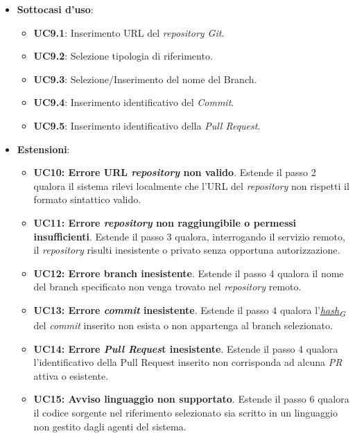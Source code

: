 \documentclass[12pt, a4paper]{article}
\newcommand{\urlglossario}{https://skynetunigroup.github.io/Code_Guardian/Documentazione/PB/glossario_v2.0.0.pdf} %
\newcommand{\glo}[2]{\href{\urlglossario\#nameddest=#2}{#1\textsubscript{G}}}
\begin{document}
\begin{itemize}
\begin{enumerate}
            \item Il sistema analizza i metadati del \textit{repository} per verificare i linguaggi di programmazione principali utilizzati nel riferimento selezionato.
            \item Il sistema registra il \textit{repository} e il riferimento selezionati come contesto per le successive operazioni degli agenti.
        \end{enumerate}
    \item \textbf{Sottocasi d'uso}:
    \begin{itemize}
        \item \textbf{UC9.1}: Inserimento URL del \textit{repository Git}.
        \item \textbf{UC9.2}: Selezione tipologia di riferimento.
        \item \textbf{UC9.3}: Selezione/Inserimento del nome del Branch.
        \item \textbf{UC9.4}: Inserimento identificativo del \textit{Commit}.
        \item \textbf{UC9.5}: Inserimento identificativo della \textit{Pull Request}.
    \end{itemize}
    \item \textbf{Estensioni}:
    \begin{itemize}
        \item \textbf{UC10: Errore URL \textit{repository} non valido}. Estende il passo 2 qualora il sistema rilevi localmente che l'URL del \textit{repository} non rispetti il formato sintattico valido.
        \item \textbf{UC11: Errore \textit{repository} non raggiungibile o permessi insufficienti}. Estende il passo 3 qualora, interrogando il servizio remoto, il \textit{repository} risulti inesistente o privato senza opportuna autorizzazione.
        \item \textbf{UC12: Errore branch inesistente}. Estende il passo 4 qualora il nome del branch specificato non venga trovato nel \textit{repository} remoto.
        \item \textbf{UC13: Errore \textit{commit} inesistente}. Estende il passo 4  qualora l'\textit{\glo{hash}{hash}} del \textit{commit} inserito non esista o non appartenga al branch selezionato.
        \item \textbf{UC14: Errore \textit{Pull Reques}t inesistente}. Estende il passo 4 qualora l'identificativo della Pull Request inserito non corrisponda ad alcuna \textit{PR} attiva o esistente.
        \item \textbf{UC15: Avviso linguaggio non supportato}. Estende il passo 6 qualora il codice sorgente nel riferimento selezionato sia scritto in un linguaggio non gestito dagli agenti del sistema.
    \end{itemize}
\end{itemize}
\end{document}

